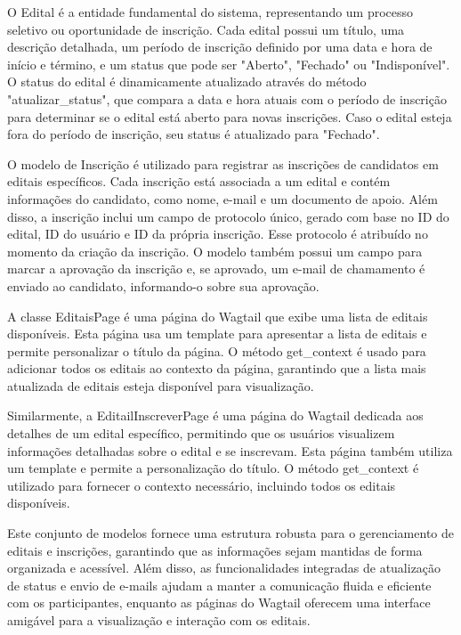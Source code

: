 O Edital é a entidade fundamental do sistema, representando um processo seletivo ou oportunidade de inscrição. Cada edital possui um título, uma descrição detalhada, um período de inscrição definido por uma data e hora de início e término, e um status que pode ser "Aberto", "Fechado" ou "Indisponível". O status do edital é dinamicamente atualizado através do método "atualizar\_status", que compara a data e hora atuais com o período de inscrição para determinar se o edital está aberto para novas inscrições. Caso o edital esteja fora do período de inscrição, seu status é atualizado para "Fechado".

O modelo de Inscrição é utilizado para registrar as inscrições de candidatos em editais específicos. Cada inscrição está associada a um edital e contém informações do candidato, como nome, e-mail e um documento de apoio. Além disso, a inscrição inclui um campo de protocolo único, gerado com base no ID do edital, ID do usuário e ID da própria inscrição. Esse protocolo é atribuído no momento da criação da inscrição. O modelo também possui um campo para marcar a aprovação da inscrição e, se aprovado, um e-mail de chamamento é enviado ao candidato, informando-o sobre sua aprovação.

A classe EditaisPage é uma página do Wagtail que exibe uma lista de editais disponíveis. Esta página usa um template para apresentar a lista de editais e permite personalizar o título da página. O método get\_context é usado para adicionar todos os editais ao contexto da página, garantindo que a lista mais atualizada de editais esteja disponível para visualização.

Similarmente, a EditailInscreverPage é uma página do Wagtail dedicada aos detalhes de um edital específico, permitindo que os usuários visualizem informações detalhadas sobre o edital e se inscrevam. Esta página também utiliza um template e permite a personalização do título. O método get\_context é utilizado para fornecer o contexto necessário, incluindo todos os editais disponíveis.

Este conjunto de modelos fornece uma estrutura robusta para o gerenciamento de editais e inscrições, garantindo que as informações sejam mantidas de forma organizada e acessível. Além disso, as funcionalidades integradas de atualização de status e envio de e-mails ajudam a manter a comunicação fluida e eficiente com os participantes, enquanto as páginas do Wagtail oferecem uma interface amigável para a visualização e interação com os editais.

